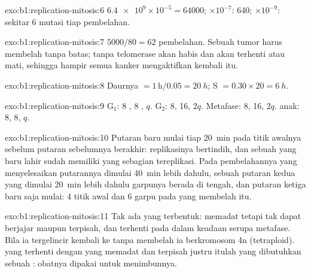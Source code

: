 \begin{solution}{exo:b1:replication-mitosis:6}
$\num{6.4e9}\times 10^{-5} = \num{64000}$; $\times 10^{-7}$: 640;
$\times 10^{-9}$: sekitar 6 mutasi tiap pembelahan.
\end{solution}

\begin{solution}{exo:b1:replication-mitosis:7}
$5000/80 = 62$ pembelahan. Sebuah tumor harus membelah tanpa batas;
tanpa telomerase  akan habis dan  akan terhenti atau
mati, sehingga hampir semua kanker mengaktifkan kembali  itu.
\end{solution}

\begin{solution}{exo:b1:replication-mitosis:8}
Daurnya $= 1\,\mathrm{h}/0.05 = \qty{20}{h}$; S $= 0.30\times 20 =
\qty{6}{h}$.
\end{solution}

\begin{solution}{exo:b1:replication-mitosis:9}
G$_1$: 8 , 8 , $q$. G$_2$: 8, 16, $2q$. Metafase:
8, 16, $2q$.  anak: 8, 8, $q$.
\end{solution}

\begin{solution}{exo:b1:replication-mitosis:10}
Putaran baru mulai tiap \qty{20}{min} pada titik awalnya sebelum
putaran sebelumnya berakhir: replikasinya bertindih, dan sebuah  yang
baru lahir sudah memiliki  yang sebagian tereplikasi. Pada
pembelahannya  yang menyelesaikan putarannya dimulai
\qty{40}{min} lebih dahulu, sebuah putaran kedua yang dimulai
\qty{20}{min} lebih dahulu garpunya berada di tengah, dan putaran ketiga
baru saja mulai: 4 titik awal dan 6 garpu pada  yang membelah itu.
\end{solution}

\begin{solution}{exo:b1:replication-mitosis:11}
Tak ada  yang terbentuk:  memadat tetapi tak dapat
berjajar maupun terpisah, dan  terhenti pada 
 dalam keadaan serupa metafase. Bila ia tergelincir kembali
ke  tanpa membelah ia berkromosom 4n (tetraploid).  yang
terhenti dengan  yang memadat dan terpisah justru itulah yang
dibutuhkan sebuah : obatnya dipakai untuk menimbunnya.
\end{solution}

